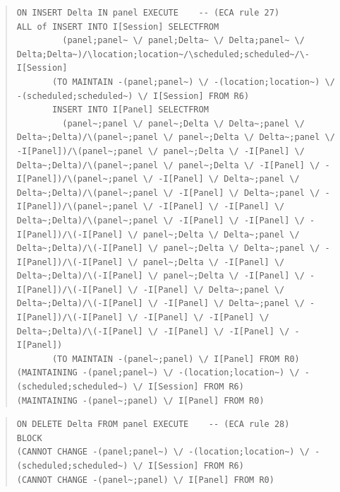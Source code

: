 \documentclass[10pt,a4paper]{report}              %
\theoremstyle{plain}\theorembodyfont{\rmfamily}\newtheorem{definition}{Definition}[section]
\theoremstyle{plain}\theorembodyfont{\rmfamily}\newtheorem{designrule}[definition]{Requirement}
\begin{document}
\begin{quote}
\begin{verbatim}
ON INSERT Delta IN panel EXECUTE    -- (ECA rule 27)
ALL of INSERT INTO I[Session] SELECTFROM
         (panel;panel~ \/ panel;Delta~ \/ Delta;panel~ \/ Delta;Delta~)/\location;location~/\scheduled;scheduled~/\-I[Session]
       (TO MAINTAIN -(panel;panel~) \/ -(location;location~) \/ -(scheduled;scheduled~) \/ I[Session] FROM R6)
       INSERT INTO I[Panel] SELECTFROM
         (panel~;panel \/ panel~;Delta \/ Delta~;panel \/ Delta~;Delta)/\(panel~;panel \/ panel~;Delta \/ Delta~;panel \/ -I[Panel])/\(panel~;panel \/ panel~;Delta \/ -I[Panel] \/ Delta~;Delta)/\(panel~;panel \/ panel~;Delta \/ -I[Panel] \/ -I[Panel])/\(panel~;panel \/ -I[Panel] \/ Delta~;panel \/ Delta~;Delta)/\(panel~;panel \/ -I[Panel] \/ Delta~;panel \/ -I[Panel])/\(panel~;panel \/ -I[Panel] \/ -I[Panel] \/ Delta~;Delta)/\(panel~;panel \/ -I[Panel] \/ -I[Panel] \/ -I[Panel])/\(-I[Panel] \/ panel~;Delta \/ Delta~;panel \/ Delta~;Delta)/\(-I[Panel] \/ panel~;Delta \/ Delta~;panel \/ -I[Panel])/\(-I[Panel] \/ panel~;Delta \/ -I[Panel] \/ Delta~;Delta)/\(-I[Panel] \/ panel~;Delta \/ -I[Panel] \/ -I[Panel])/\(-I[Panel] \/ -I[Panel] \/ Delta~;panel \/ Delta~;Delta)/\(-I[Panel] \/ -I[Panel] \/ Delta~;panel \/ -I[Panel])/\(-I[Panel] \/ -I[Panel] \/ -I[Panel] \/ Delta~;Delta)/\(-I[Panel] \/ -I[Panel] \/ -I[Panel] \/ -I[Panel])
       (TO MAINTAIN -(panel~;panel) \/ I[Panel] FROM R0)
(MAINTAINING -(panel;panel~) \/ -(location;location~) \/ -(scheduled;scheduled~) \/ I[Session] FROM R6)
(MAINTAINING -(panel~;panel) \/ I[Panel] FROM R0)
\end{verbatim}
\end{quote}
\begin{quote}
\begin{verbatim}
ON DELETE Delta FROM panel EXECUTE    -- (ECA rule 28)
BLOCK
(CANNOT CHANGE -(panel;panel~) \/ -(location;location~) \/ -(scheduled;scheduled~) \/ I[Session] FROM R6)
(CANNOT CHANGE -(panel~;panel) \/ I[Panel] FROM R0)
\end{verbatim}
\end{quote}
\end{document}
